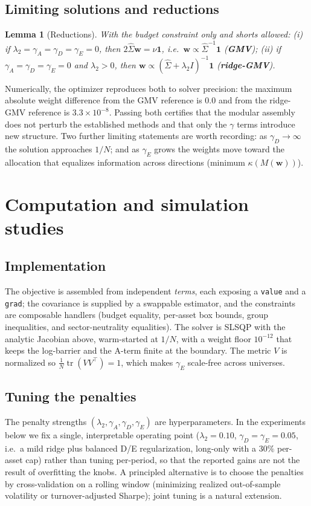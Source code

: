 \documentclass[11pt]{article}
\newcommand{\Sighat}{\hat\Sigma}
\newcommand{\tr}{\operatorname{tr}}
\newcommand{\one}{\mathbf{1}}
\newcommand{\w}{\mathbf{w}}
\newcommand{\M}{M(\w)}
\newtheorem{lemma}{Lemma}
\begin{document}
\subsection{Limiting solutions and reductions}
\label{sec:reductions}
\begin{lemma}[Reductions]
With the budget constraint only and shorts allowed:
(i) if $\lambda_2=\gamma_A=\gamma_D=\gamma_E=0$, then $2\Sighat\w=\nu\one$, i.e.\
$\w\propto\Sighat^{-1}\one$ (\textbf{GMV}); (ii) if
$\gamma_A=\gamma_D=\gamma_E=0$ and $\lambda_2>0$, then
$\w\propto(\Sighat+\lambda_2 I)^{-1}\one$ (\textbf{ridge-GMV}).
\end{lemma}
Numerically, the optimizer reproduces both to solver precision: the maximum
absolute weight difference from the GMV reference is $0.0$ and from the ridge-GMV
reference is $3.3\times10^{-8}$. Passing both certifies that the modular assembly
does not perturb the established methods and that only the $\gamma$ terms
introduce new structure. Two further limiting statements are worth recording: as
$\gamma_D\to\infty$ the solution approaches $1/N$; and as $\gamma_E$ grows the
weights move toward the allocation that equalizes information across directions
(minimum $\kappa(\M)$).

\section{Computation and simulation studies}
\label{sec:computation}
\subsection{Implementation}
The objective is assembled from independent \emph{terms}, each exposing a
\texttt{value} and a \texttt{grad}; the covariance is supplied by a swappable
estimator, and the constraints are composable handlers (budget equality,
per-asset box bounds, group inequalities, and sector-neutrality equalities). The
solver is SLSQP with the analytic Jacobian above, warm-started at $1/N$, with a
weight floor $10^{-12}$ that keeps the log-barrier and the A-term finite at the
boundary. The metric $V$ is normalized so $\tfrac1N\tr(VV^\top)=1$, which makes
$\gamma_E$ scale-free across universes.

\subsection{Tuning the penalties}
The penalty strengths $(\lambda_2,\gamma_A,\gamma_D,\gamma_E)$ are hyperparameters.
In the experiments below we fix a single, interpretable operating point
($\lambda_2=0.10$, $\gamma_D=\gamma_E=0.05$, i.e.\ a mild ridge plus balanced
D/E regularization, long-only with a $30\%$ per-asset cap) rather than tuning
per-period, so that the reported gains are not the result of overfitting the
knobs. A principled alternative is to choose the penalties by cross-validation on
a rolling window (minimizing realized out-of-sample volatility or turnover-adjusted
Sharpe); joint tuning is a natural extension.
\end{document}
